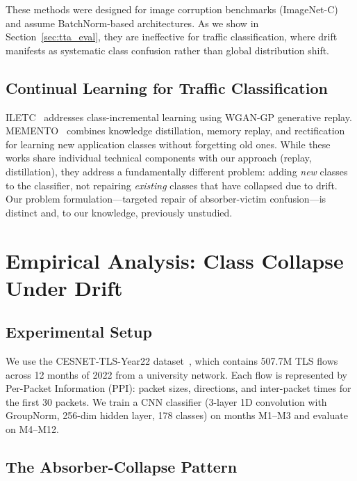 \documentclass[journal]{IEEEtran}
\begin{document}
These methods were designed for image corruption benchmarks (ImageNet-C) and assume BatchNorm-based architectures.
As we show in Section~\ref{sec:tta_eval}, they are ineffective for traffic classification, where drift manifests as systematic class confusion rather than global distribution shift.

\subsection{Continual Learning for Traffic Classification}

ILETC~\cite{zhu2023iletc} addresses class-incremental learning using WGAN-GP generative replay.
MEMENTO~\cite{cerasuolo2024memento} combines knowledge distillation, memory replay, and rectification for learning new application classes without forgetting old ones.
While these works share individual technical components with our approach (replay, distillation), they address a fundamentally different problem: adding \textit{new} classes to the classifier, not repairing \textit{existing} classes that have collapsed due to drift.
Our problem formulation---targeted repair of absorber-victim confusion---is distinct and, to our knowledge, previously unstudied.


\section{Empirical Analysis: Class Collapse Under Drift}
\label{sec:analysis}

\subsection{Experimental Setup}

We use the CESNET-TLS-Year22 dataset~\cite{hynek2024cesnet}, which contains 507.7M TLS flows across 12 months of 2022 from a university network.
Each flow is represented by Per-Packet Information (PPI): packet sizes, directions, and inter-packet times for the first 30 packets.
We train a CNN classifier (3-layer 1D convolution with GroupNorm, 256-dim hidden layer, 178 classes) on months M1--M3 and evaluate on M4--M12.

\subsection{The Absorber-Collapse Pattern}
\label{sec:absorber}
\end{document}

